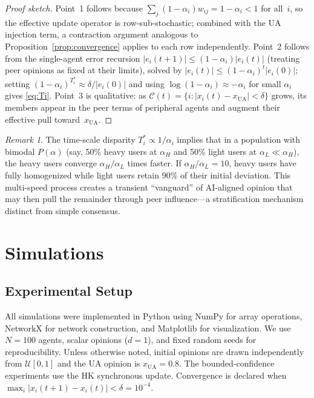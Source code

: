 \documentclass{article}
\theoremstyle{plain}
\theoremstyle{definition}
\theoremstyle{remark}
\newtheorem{remark}[theorem]{Remark}
\newcommand{\xUA}{x_{\mathrm{UA}}}
\begin{document}
\begin{proof}[Proof sketch]
Point~1 follows because $\sum_j (1-\alpha_i)w_{ij}=1-\alpha_i<1$ for all~$i$,
so the effective update operator is row-sub-stochastic; combined with the
UA injection term, a contraction argument analogous to Proposition~\ref{prop:convergence}
applies to each row independently.  Point~2 follows from the single-agent
error recursion $|e_i(t+1)|\leq(1-\alpha_i)|e_i(t)|$ (treating peer opinions
as fixed at their limits), solved by $|e_i(t)|\leq(1-\alpha_i)^t|e_i(0)|$;
setting $(1-\alpha_i)^{T_i^*}\approx\delta/|e_i(0)|$ and using
$\log(1-\alpha_i)\approx-\alpha_i$ for small $\alpha_i$ gives \eqref{eq:Ti}.
Point~3 is qualitative: as $\mathcal{C}(t)=\{i:|x_i(t)-\xUA|<\delta\}$ grows,
its members appear in the peer terms of peripheral agents and augment their
effective pull toward~$\xUA$.
\end{proof}

\begin{remark}
The time-scale disparity $T_i^*\propto 1/\alpha_i$ implies that in a
population with bimodal $P(\alpha)$ (say, 50\% heavy users at
$\alpha_H$ and 50\% light users at $\alpha_L\ll\alpha_H$), the heavy
users converge $\alpha_H/\alpha_L$ times faster.  If $\alpha_H/\alpha_L=10$,
heavy users have fully homogenized while light users retain 90\% of
their initial deviation.  This multi-speed process creates a transient
``vanguard'' of AI-aligned opinion that may then pull the remainder
through peer influence---a stratification mechanism distinct from simple
consensus.
\end{remark}

\section{Simulations}
\label{sec:simulations}

\subsection{Experimental Setup}

All simulations were implemented in Python using NumPy for array operations,
NetworkX for network construction, and Matplotlib for visualization.
We use $N=100$ agents, scalar opinions ($d=1$), and fixed random seeds
for reproducibility.  Unless otherwise noted, initial opinions are drawn
independently from $\mathcal{U}[0,1]$ and the UA opinion is $\xUA=0.8$.
The bounded-confidence experiments use the HK synchronous update.
Convergence is declared when $\max_i|x_i(t+1)-x_i(t)|<\delta=10^{-4}$.
\end{document}
